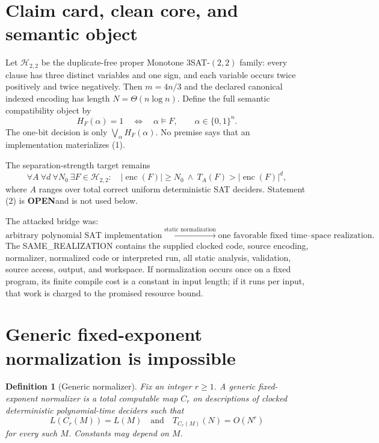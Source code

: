 \documentclass[11pt]{article}
\newtheorem{definition}{Definition}
\newcommand{\Htwo}{\mathcal H_{2,2}}
\newcommand{\OPEN}{\textbf{OPEN}}
\begin{document}
\section{Claim card, clean core, and semantic object}

Let $\Htwo$ be the duplicate-free proper Monotone $3$SAT-$(2,2)$ family:
every clause has three distinct variables and one sign, and each variable
occurs twice positively and twice negatively.  Then $m=4n/3$ and the declared
canonical indexed encoding has length $N=\Theta(n\log n)$.  Define the full
semantic compatibility object by
\[
 H_F(\alpha)=1\quad\Longleftrightarrow\quad \alpha\models F,
 \qquad \alpha\in\{0,1\}^{n}.                         \tag{1}
\]
The one-bit decision is only $\bigvee_\alpha H_F(\alpha)$.  No premise says
that an implementation materializes (1).

The separation-strength target remains
\[
 \forall A\ \forall d\ \forall N_0\ \exists F\in\Htwo:\quad
 |\operatorname{enc}(F)|\ge N_0
 \ \land\ T_A(F)>|\operatorname{enc}(F)|^d,             \tag{2}
\]
where $A$ ranges over total correct uniform deterministic SAT deciders.
Statement (2) is \OPEN and is not used below.

The attacked bridge was:
\[
 \text{arbitrary polynomial SAT implementation}
 \xrightarrow{\text{static normalization}}
 \text{one favorable fixed time--space realization}.     \tag{3}
\]
The SAME\_REALIZATION contains the supplied clocked code, source encoding,
normalizer, normalized code or interpreted run, all static analysis,
validation, source access, output, and workspace.  If normalization occurs
once on a fixed program, its finite compile cost is a constant in input length;
if it runs per input, that work is charged to the promised resource bound.

\section{Generic fixed-exponent normalization is impossible}

\begin{definition}[Generic normalizer]
Fix an integer $r\ge1$.  A generic fixed-exponent normalizer is a total
computable map $C_r$ on descriptions of clocked deterministic polynomial-time
deciders such that
\[
 L(C_r(M))=L(M)
 \quad\text{and}\quad
 T_{C_r(M)}(N)=O(N^r)                                  \tag{4}
\]
for every such $M$.  Constants may depend on $M$.
\end{definition}
\end{document}
